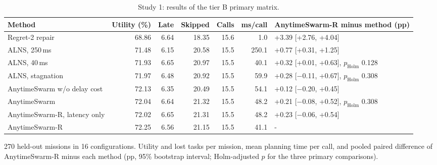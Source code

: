 \begin{table}[t]
\caption{Study 1: results of the tier B primary matrix.}\label{tab:main}
\centering\small
\setlength{\tabcolsep}{3pt}
\begin{threeparttable}
\begin{tabular}{lrrrrrl}
\toprule
Method & Utility (\%) & Late & Skipped & Calls & ms/call & AnytimeSwarm-R minus method (pp) \\
\midrule
Regret-2 repair & 68.86 & 6.64 & 18.35 & 15.6 & 1.0 & +3.39 [+2.76, +4.04] \\
ALNS, 250\,ms & 71.48 & 6.15 & 20.58 & 15.5 & 250.1 & +0.77 [+0.31, +1.25] \\
ALNS, 40\,ms & 71.93 & 6.65 & 20.97 & 15.5 & 40.1 & +0.32 [+0.01, +0.63], $p_{\mathrm{Holm}}$ 0.128 \\
ALNS, stagnation & 71.97 & 6.48 & 20.92 & 15.5 & 59.9 & +0.28 [$-$0.11, +0.67], $p_{\mathrm{Holm}}$ 0.308 \\
AnytimeSwarm w/o delay cost & 72.13 & 6.35 & 20.49 & 15.5 & 54.1 & +0.12 [$-$0.20, +0.45] \\
AnytimeSwarm & 72.04 & 6.64 & 21.32 & 15.5 & 48.2 & +0.21 [$-$0.08, +0.52], $p_{\mathrm{Holm}}$ 0.308 \\
AnytimeSwarm-R, latency only & 72.02 & 6.65 & 21.31 & 15.5 & 48.2 & +0.23 [$-$0.06, +0.54] \\
AnytimeSwarm-R & 72.25 & 6.56 & 21.15 & 15.5 & 41.1 & - \\
\bottomrule
\end{tabular}
\begin{tablenotes}[flushleft]\scriptsize
\item[] 270 held-out missions in 16 configurations. Utility and lost tasks per mission, mean planning time per call, and pooled paired difference of AnytimeSwarm-R minus each method (pp, 95\% bootstrap interval; Holm-adjusted $p$ for the three primary comparisons).
\end{tablenotes}
\end{threeparttable}
\end{table}
